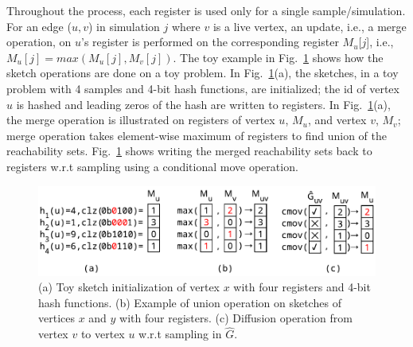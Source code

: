 

Throughout the process, each register is used only for a single sample/simulation. 
For an edge ($u, v$) in simulation $j$ where $v$ is a live vertex, an update, i.e., a merge operation, on $u$'s register is performed on the corresponding register $M_u$[$j$], i.e., $M_u[j] = max(M_u[j],M_v[j])$. 
The toy example in Fig.~\ref{fig:fmops} shows how the sketch operations are done on a toy problem. In Fig.~\ref{fig:fmops}(a), the sketches, in a toy problem with 4 samples and 4-bit hash functions, are initialized; the id of vertex $u$ is hashed and leading zeros of the hash are written to registers. In Fig.~\ref{fig:fmops}(a), the merge operation is illustrated on registers of vertex $u$, $M_u$, and vertex $v$, $M_v$; merge operation takes element-wise maximum of registers to find union of the reachability sets. Fig.~\ref{fig:fmops} shows writing the merged reachability sets back to registers w.r.t sampling using a conditional move operation.


\begin{figure}[!ht]
    \begin{center}
    \includegraphics[width=\linewidth]{images/fmops.pdf}
    \caption{ (a) \label{fminit} Toy sketch initialization of vertex $x$ with four registers and 4-bit hash functions. (b) \label{fmmerge} Example of union operation on sketches of vertices $x$ and $y$ with four registers. (c) \label{fmwrite} Diffusion operation from vertex $v$ to vertex $u$ w.r.t sampling in $\hat{G}$. 
     }\label{fig:fmops} 
    \end{center}
\end{figure}

